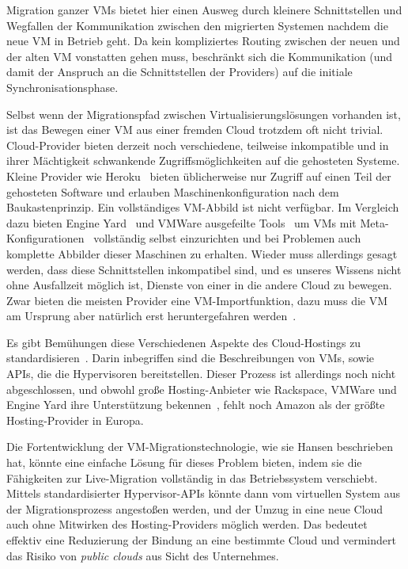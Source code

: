 Migration ganzer \acp{VM} bietet hier einen Ausweg durch kleinere
Schnittstellen und Wegfallen der Kommunikation zwischen den migrierten
Systemen nachdem die neue \ac{VM} in Betrieb geht. Da kein kompliziertes
Routing zwischen der neuen und der alten \ac{VM} vonstatten gehen muss,
beschränkt sich die Kommunikation (und damit der Anspruch an die
Schnittstellen der Providers) auf die initiale Synchronisationsphase.

Selbst wenn der Migrationspfad zwischen Virtualisierungslösungen
vorhanden ist, ist das Bewegen einer \ac{VM} aus einer fremden Cloud
trotzdem oft nicht trivial. Cloud-Provider bieten derzeit noch
verschiedene, teilweise inkompatible und in ihrer Mächtigkeit
schwankende Zugriffsmöglichkeiten auf die gehosteten Systeme. Kleine
Provider wie Heroku~\cite{heroku} bieten üblicherweise nur Zugriff auf
einen Teil der gehosteten Software und erlauben Maschinenkonfiguration
nach dem Baukastenprinzip. Ein vollständiges \ac{VM}-Abbild ist nicht
verfügbar. Im Vergleich dazu bieten Engine Yard~\cite{engineyard} und
VMWare ausgefeilte Tools~\cite{engineyard-cli} um \acp{VM} mit
Meta-Konfigurationen~\cite{opscode-chef} vollständig selbst
einzurichten und bei Problemen auch komplette Abbilder dieser Maschinen
zu erhalten. Wieder muss allerdings gesagt werden, dass diese
Schnittstellen inkompatibel sind, und es unseres Wissens nicht ohne
Ausfallzeit möglich ist, Dienste von einer in die andere Cloud zu
bewegen. Zwar bieten die meisten Provider eine \ac{VM}-Importfunktion,
dazu muss die \ac{VM} am Ursprung aber natürlich erst heruntergefahren
werden~\cite{amazon-import}.

Es gibt Bemühungen diese Verschiedenen Aspekte des Cloud-Hostings zu
standardisieren~\cite{cloudstandard}. Darin inbegriffen sind die
Beschreibungen von \acp{VM}, sowie \acp{API}, die die Hypervisoren
bereitstellen. Dieser Prozess ist allerdings noch nicht abgeschlossen,
und obwohl große Hosting-Anbieter wie Rackspace, VMWare und Engine
Yard ihre Unterstützung bekennen~\cite{openstack}, fehlt \zB noch
Amazon als der größte Hosting-Provider in Europa.

Die Fortentwicklung der \ac{VM}-Migrationstechnologie, wie sie Hansen
beschrieben hat, könnte eine einfache Lösung für dieses Problem
bieten, indem sie die Fähigkeiten zur Live-Migration vollständig in
das Betriebssystem verschiebt. Mittels standardisierter
Hypervisor-APIs könnte dann vom virtuellen System aus der
Migrationsprozess angestoßen werden, und der Umzug in eine neue Cloud
auch ohne Mitwirken des Hosting-Providers möglich werden. Das bedeutet
effektiv eine Reduzierung der Bindung an eine bestimmte Cloud und
vermindert das Risiko von \emph{public clouds} aus Sicht des
Unternehmes.

